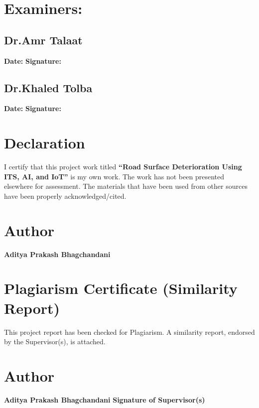 \documentclass[12pt,a4paper]{report}
\begin{document}
\section*{Examiners:}
\vspace{0.3cm}
\subsection*{Dr.Amr Talaat}
\vspace{0.3cm}
\textbf{Date:}
\hspace{4cm}
\textbf{Signature:}
\subsection*{Dr.Khaled Tolba}
\vspace{0.3cm}
\textbf{Date:}
\hspace{4cm}
\textbf{Signature:}

\newpage
\section*{Declaration}
I certify that this project work titled \textbf{\textquotedblleft Road Surface Deterioration Using ITS, AI, and IoT\textquotedblright} is my own work. The work has not been presented elsewhere for assessment. The materials that have been used from other sources have been properly acknowledged/cited.
\vspace{2cm}
\section*{Author}
\textbf{Aditya Prakash Bhagchandani}

\newpage
\section*{Plagiarism Certificate (Similarity Report)}
This project report has been checked for Plagiarism. A similarity report, endorsed by the Supervisor(s), is attached.
\vspace{2cm}
\section*{Author}
\textbf{Aditya Prakash Bhagchandani}
\vspace{2cm}
\textbf{Signature of Supervisor(s)}

\newpage
\end{document}
